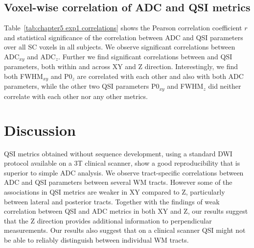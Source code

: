 \subsection{Voxel-wise correlation of ADC and QSI metrics}
Table~\ref{tab:chapter5 exp1 correlations} shows the Pearson correlation coefficient $\mathit{r}$ and statistical significance of the correlation between ADC and \gls{QSI} parameters over all \gls{SC} voxels in all subjects. We observe significant correlations between \gls{ADC}$_{xy}$ and \gls{ADC}$_z$. Further we find significant correlations between
and \gls{QSI} parameters, both within and across XY and Z direction. Interestingly, we find both FWHM$_{xy}$ and P0$_z$ are correlated with each other and also with both ADC parameters, while the other two \gls{QSI} parameters P0$_{xy}$ and FWHM$_z$ did neither correlate with each other nor any other metrics.%
\section{Discussion} \gls{QSI} metrics obtained without sequence development, using a standard {\gls{DWI}} protocol available on a 3T clinical scanner, show a good reproducibility that is superior to simple \gls{ADC} analysis. We observe tract-specific correlations between \gls{ADC} and \gls{QSI} parameters between several WM tracts. However some of the associations in \gls{QSI} metrics are weaker in XY compared to Z, particularly between lateral and posterior tracts. Together with the findings of weak correlation between \gls{QSI} and ADC metrics in both XY and Z, our results suggest that the Z direction provides additional information to perpendicular measurements. Our results also suggest that on a clinical scanner \gls{QSI} might not be able to reliably distinguish between individual \gls{WM} tracts.

